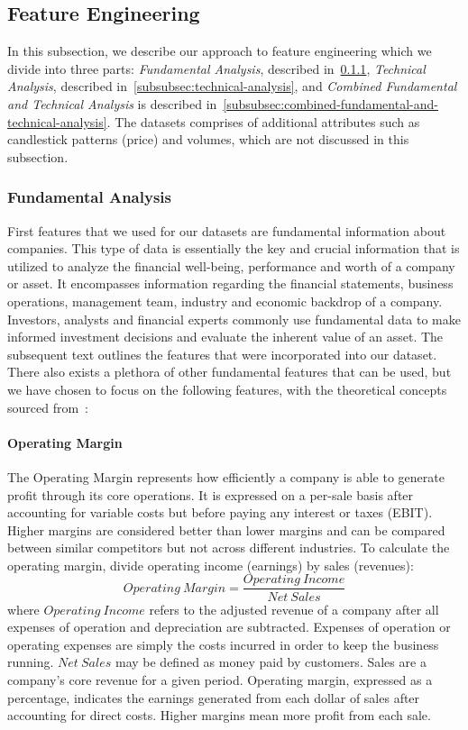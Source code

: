 \documentclass[../xlapes02]{subfiles}
\begin{document}
    \subsection{Feature Engineering}\label{subsec:feature-engineering}
    In this subsection, we describe our approach to feature engineering which we divide into three parts: \emph{Fundamental Analysis}, described in~\cref{subsubsec:fundamental-analysis}, \emph{Technical Analysis}, described in~\cref{subsubsec:technical-analysis}, and \emph{Combined Fundamental and Technical Analysis} is described in~\cref{subsubsec:combined-fundamental-and-technical-analysis}. The datasets comprises of additional attributes such as candlestick patterns (price) and volumes, which are not discussed in this subsection.

    \subsubsection{Fundamental Analysis}\label{subsubsec:fundamental-analysis}
    First features that we used for our datasets are fundamental information about companies. This type of data is essentially the key and crucial information that is utilized to analyze the financial well-being, performance and worth of a company or asset. It encompasses information regarding the financial statements, business operations, management team, industry and economic backdrop of a company. Investors, analysts and financial experts commonly use fundamental data to make informed investment decisions and evaluate the inherent value of an asset. The subsequent text outlines the features that were incorporated into our dataset. There also exists a plethora of other fundamental features that can be used, but we have chosen to focus on the following features, with the theoretical concepts sourced from~\cite{investopedia}:

    \paragraph{Operating Margin}\label{par:operating-margin}
    The Operating Margin represents how efficiently a company is able to generate profit through its core operations. It is expressed on a per-sale basis after accounting for variable costs but before paying any interest or taxes (EBIT). Higher margins are considered better than lower margins and can be compared between similar competitors but not across different industries. To calculate the operating margin, divide operating income (earnings) by sales (revenues):
    \begin{equation}
        Operating\ Margin=\frac{Operating\ Income}{Net\ Sales}
    \end{equation}
    where $Operating\ Income$ refers to the adjusted revenue of a company after all expenses of operation and depreciation are subtracted. Expenses of operation or operating expenses are simply the costs incurred in order to keep the business running. $Net\ Sales$ may be defined as money paid by customers. Sales are a company's core revenue for a given period. Operating margin, expressed as a percentage, indicates the earnings generated from each dollar of sales after accounting for direct costs. Higher margins mean more profit from each sale.
\end{document}
